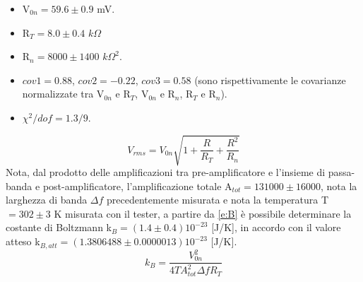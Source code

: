 \begin{itemize}
\item V$_{0n} = 59.6 \pm 0.9$ mV.
\item R$_T = 8.0 \pm 0.4$ $k\Omega$
\item R$_n = 8000 \pm 1400$ ${k\Omega}^2$.
\item $cov1 = 0.88$, $cov2 = -0.22$, $cov3 = 0.58$ (sono rispettivamente le covarianze normalizzate tra V$_{0n}$ e R$_T$, V$_{0n}$ e R$_n$, R$_T$ e R$_n$).
\item $\chi^2/dof = 1.3/9$.
\end{itemize}
\begin{equation}
V_{rms} = V_{0n} \sqrt{1+\frac{R}{R_T} + \frac{R^2}{R_n}}
\label{e:tot}
\end{equation}
Nota, dal prodotto delle amplificazioni tra pre-amplificatore e l'insieme di passa-banda e post-amplificatore, l'amplificazione totale A$_{tot} = 131000 \pm 16000$, nota la larghezza di banda $\Delta f$ precedentemente misurata e nota la temperatura T$ = 302 \pm 3$ K misurata con il tester, a partire da \ref{e:B} è possibile determinare la costante di Boltzmann k$_B = (1.4 \pm 0.4)10^{-23}$ [J/K], in accordo con il valore atteso k$_{B,att} = (1.3806488 \pm 0.0000013)10^{-23}$ [J/K].
\begin{equation}
k_B = \frac{V_{0n}^2}{4 T {A_{tot}^2} \Delta f R_T}
\label{e:B}
\end{equation}

